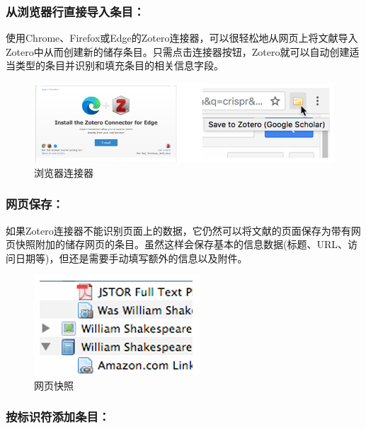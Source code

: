 \documentclass[]{ctexbook}
\theoremstyle{definition}
\theoremstyle{definition}
\theoremstyle{definition}
\theoremstyle{definition}
\theoremstyle{remark}
\begin{document}
\subsubsection{从浏览器行直接导入条目：}\label{ux4eceux6d4fux89c8ux5668ux884cux76f4ux63a5ux5bfcux5165ux6761ux76ee}

使用Chrome、Firefox或Edge的Zotero连接器，可以很轻松地从网页上将文献导入Zotero中从而创建新的储存条目。只需点击连接器按钮，Zotero就可以自动创建适当类型的条目并识别和填充条目的相关信息字段。

\begin{figure}

{\centering \includegraphics[width=0.9\linewidth]{img/zotero/zotero_connector} 

}

\caption{浏览器连接器}\label{fig:zotero-connector}
\end{figure}

\subsubsection{网页保存：}\label{ux7f51ux9875ux4fddux5b58}

如果Zotero连接器不能识别页面上的数据，它仍然可以将文献的页面保存为带有网页快照附加的储存网页的条目。虽然这样会保存基本的信息数据(标题、URL、访问日期等)，但还是需要手动填写额外的信息以及附件。

\begin{figure}

{\centering \includegraphics[width=0.4\linewidth]{img/zotero/zotero_websave} 

}

\caption{网页快照}\label{fig:zotero-websave}
\end{figure}

\subsubsection{按标识符添加条目：}\label{ux6309ux6807ux8bc6ux7b26ux6dfbux52a0ux6761ux76ee}
\end{document}
